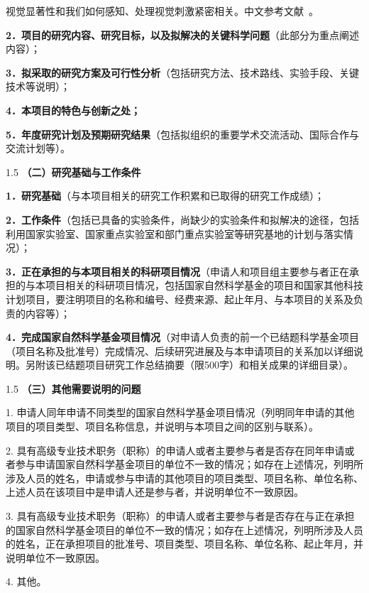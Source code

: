 \documentclass[14pt]{extarticle}
\newcommand{\alert}[1]{\textcolor[rgb]{0.0625,0.4453,0.7383}{#1}}
\newcommand{\NsfcNote}[1]{\begin{spacing}{1.5} \alert{#1} \end{spacing}}
\newcommand{\NsfcSubNote}[1]{\alert{#1} \par}
\begin{document}
视觉显著性和我们如何感知、处理视觉刺激紧密相关。中文参考文献~\cite{huangzhiyong2011}。

{\small


}

\NsfcSubNote{\textbf{2．项目的研究内容、研究目标，以及拟解决的关键科学问题}（此部分为重点阐述内容）；}


\NsfcSubNote{\textbf{3．拟采取的研究方案及可行性分析}（包括研究方法、技术路线、实验手段、关键技术等说明）；}


\NsfcSubNote{\textbf{4．本项目的特色与创新之处；}}


\NsfcSubNote{\textbf{5．年度研究计划及预期研究结果}（包括拟组织的重要学术交流活动、国际合作与交流计划等）。}


\NsfcNote{\textbf{（二）研究基础与工作条件}}
\NsfcSubNote{\textbf{1．研究基础}（与本项目相关的研究工作积累和已取得的研究工作成绩）；}


\NsfcSubNote{\textbf{2．工作条件}（包括已具备的实验条件，尚缺少的实验条件和拟解决的途径，包括利用国家实验室、国家重点实验室和部门重点实验室等研究基地的计划与落实情况）；}


\NsfcSubNote{\textbf{3．正在承担的与本项目相关的科研项目情况}（申请人和项目组主要参与者正在承担的与本项目相关的科研项目情况，包括国家自然科学基金的项目和国家其他科技计划项目，要注明项目的名称和编号、经费来源、起止年月、与本项目的关系及负责的内容等）；}


\NsfcSubNote{\textbf{4．完成国家自然科学基金项目情况}（对申请人负责的前一个已结题科学基金项目（项目名称及批准号）完成情况、后续研究进展及与本申请项目的关系加以详细说明。另附该已结题项目研究工作总结摘要（限500字）和相关成果的详细目录）。}


\NsfcNote{\textbf{（三）其他需要说明的问题}}
\NsfcSubNote{1. 申请人同年申请不同类型的国家自然科学基金项目情况（列明同年申请的其他项目的项目类型、项目名称信息，并说明与本项目之间的区别与联系）。}


\NsfcSubNote{2. 具有高级专业技术职务（职称）的申请人或者主要参与者是否存在同年申请或者参与申请国家自然科学基金项目的单位不一致的情况；如存在上述情况，列明所涉及人员的姓名，申请或参与申请的其他项目的项目类型、项目名称、单位名称、上述人员在该项目中是申请人还是参与者，并说明单位不一致原因。}


\NsfcSubNote{3. 具有高级专业技术职务（职称）的申请人或者主要参与者是否存在与正在承担的国家自然科学基金项目的单位不一致的情况；如存在上述情况，列明所涉及人员的姓名，正在承担项目的批准号、项目类型、项目名称、单位名称、起止年月，并说明单位不一致原因。}


\NsfcSubNote{4. 其他。}
\end{document}
